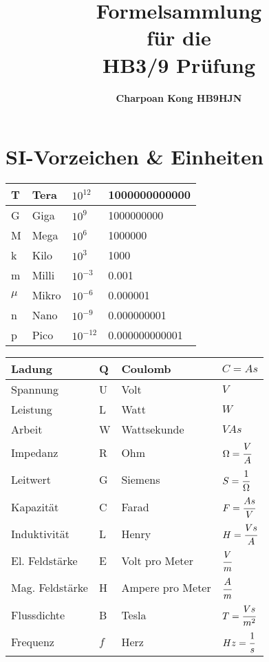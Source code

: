 \documentclass[12pt,a5paper,ngerman,titlepage]{article}
\title{\Huge \textbf{Formelsammlung} \\ \large für die \\HB3/9 Prüfung}
\author{\textbf{Charpoan Kong HB9HJN}}
\date{}
\begin{document}
\maketitle
{}
\tableofcontents
\newpage
{}%
\section{SI-Vorzeichen \& Einheiten}
\begin{table}[!h]
\begin{tabular}{ | l | l | l | l |}
\hline
T 		& Tera 	& $10^{12}$	 & 1000000000000	\\ \hline
G 		& Giga 	& $10^9$ 	 & 1000000000 		\\ \hline
M 		& Mega 	& $10^6$ 	 & 1000000 			\\ \hline
k 		& Kilo 	& $10^3$ 	 & 1000	 			\\ \hline
m 		& Milli & $10^{-3}$  & 0.001	 		\\ \hline
$\mu$ 	& Mikro & $10^{-6}$  & 0.000001	 		\\ \hline
n 		& Nano 	& $10^{-9}$  & 0.000000001	 	\\ \hline
p 		& Pico 	& $10^{-12}$ & 0.000000000001	\\ \hline

\end{tabular}
\end{table}
\begin{table}[!h]
\begin{tabular}{ | l | l | l | l |}
\hline
Ladung 				& Q 	& Coulomb 			& $C=As$				 \\ \hline
Spannung 			& U 	& Volt 	 			& $V$ 					 \\ \hline
Leistung 			& L 	& Watt 	 			& $W$ 					 \\ \hline
Arbeit 				& W 	& Wattsekunde 	 	& $VAs$	 				 \\ \hline
Impedanz 			& R	 	& Ohm  				& $\Omega=\cfrac{V}{A}$	 \\ \hline
Leitwert 			& G 	& Siemens  			& $S = \cfrac{1}{\Omega}$ \\ \hline
Kapazität 			& C 	& Farad  			& $F = \cfrac{As}{V}$	 \\ \hline
Induktivität		& L 	& Henry 			& $H = \cfrac{Vs}{A}$	 \\ \hline
El. Feldstärke		& E 	& Volt pro Meter 	& $\cfrac{V}{m}$			 \\ \hline
Mag. Feldstärke		& H 	& Ampere pro Meter 	& $\cfrac{A}{m}$			 \\ \hline
Flussdichte			& B 	& Tesla 			& $T = \cfrac{Vs}{m^2}$	 \\ \hline
Frequenz			& $f$ 	& Herz 				& $Hz = \cfrac{1}{s}$	 \\ \hline
\end{tabular}
\end{table}
\newpage
\end{document}
